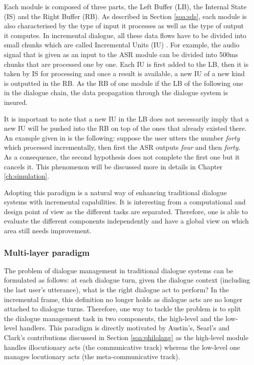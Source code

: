             Each module is composed of three parts, the Left Buffer (LB), the Internal State (IS) and the Right Buffer (RB). As described in Section \ref{soa:sds}, each module is also characterised by the type of input it processes as well as the type of output it computes. In incremental dialogue, all these data flows have to be divided into small chunks which are called Incremental Units (IU) \cite{Schlangen2011}. For example, the audio signal that is given as an input to the ASR module can be divided into 500ms chunks that are processed one by one. Each IU is first added to the LB, then it is taken by IS for processing and once a result is available, a new IU of a new kind is outputted in the RB. As the RB of one module if the LB of the following one in the dialogue chain, the data propagation through the dialogue system is insured.
            
            It is important to note that a new IU in the LB does not necessarily imply that a new IU will be pushed into the RB on top of the ones that already existed there. An example given in \cite{Schlangen2011} is the following: suppose the user utters the number \textit{forty} which processed incrementally, then first the ASR outputs \textit{four} and then \textit{forty}. As a consequence, the second hypothesis does not complete the first one but it cancels it. This phenomenon will be discussed more in details in Chapter \ref{ch:simulation}.
            
            Adopting this paradigm is a natural way of enhancing traditional dialogue systems with incremental capabilities. It is interesting from a computational and design point of view as the different tasks are separated. Therefore, one is able to evaluate the different components independently \cite{Baumann2011} and have a global view on which area still needs improvement.
        
        \subsubsection{Multi-layer paradigm}
        
        	The problem of dialogue management in traditional dialogue systems can be formulated as follows: at each dialogue turn, given the dialogue context (including the last user's utterance), what is the right dialogue act to perform? In the incremental frame, this definition no longer holds as dialogue acts are no longer attached to dialogue turns. Therefore, one way to tackle the problem is to split the dialogue management task in two components, the high-level and the low-level handlers. This paradigm is directly motivated by Austin's, Searl's and Clark's contributions discussed in Section \ref{soa:philolang} as the high-level module handles illocutionary acts (the communicative track) whereas the low-level one manages locutionary acts (the meta-communicative track).
            
